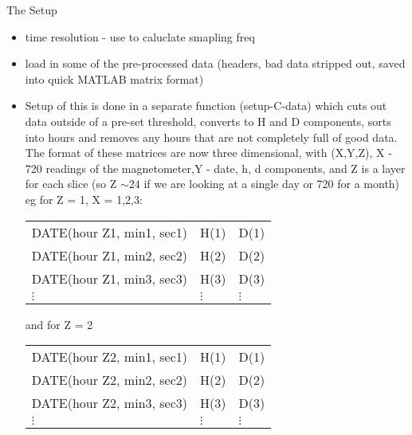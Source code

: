 \documentclass[11pt]{article}
\begin{document}
The Setup
\begin{itemize}
    \item time resolution - use to caluclate smapling freq
    \item load in some of the pre-processed data (headers, bad data stripped out, saved into
        quick MATLAB matrix format)
    \item Setup of this is done in a separate function (setup-C-data) which cuts out data outside of
        a pre-set threshold, converts to H and D components, sorts into hours and removes any
        hours that are not completely full of good data. The format of these matrices
        are now three dimensional, with (X,Y,Z), X - 720 readings of the magnetometer,Y
        - date, h, d components, and Z is a layer for each slice (so Z $\sim24$ if we are looking
        at a single day or 720 for a month) eg for Z = 1, X = 1,2,3:  

        \begin{table}[h]
            \begin{tabular}{lll}
            DATE(hour Z1, min1, sec1) &H(1) &D(1) \\
            DATE(hour Z1, min2, sec2) &H(2) &D(2) \\
            DATE(hour Z1, min3, sec3) &H(3) &D(3) \\
            $\vdots$ &$\vdots$  &$\vdots$
            \end{tabular}
        \end{table}

    and for Z = 2

        \begin{table}[h]
            \begin{tabular}{lll}
            DATE(hour Z2, min1, sec1) &H(1) &D(1) \\
            DATE(hour Z2, min2, sec2) &H(2) &D(2) \\
            DATE(hour Z2, min3, sec3) &H(3) &D(3) \\
        $\vdots$ &$\vdots$  &$\vdots$
        \end{tabular}
    \end{table}



\end{itemize}
\end{document}
